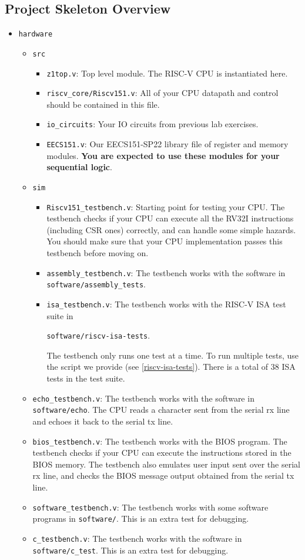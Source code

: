 \documentclass[11pt]{article}
\begin{document}
\subsection{Project Skeleton Overview}
\begin{itemize}
  \item \texttt{hardware}
    \begin{itemize}
      \item \texttt{src}
        \begin{itemize}
          \item \texttt{z1top.v}: Top level module. The RISC-V CPU is instantiated here.
          \item \texttt{riscv\_core/Riscv151.v}: All of your CPU datapath and control should be contained in this file.
          \item \texttt{io\_circuits}: Your IO circuits from previous lab exercises.
          \item \texttt{EECS151.v}: Our EECS151-SP22 library file of register and memory modules. \textbf{You are expected to use these modules for your sequential logic}.
        \end{itemize}
      \item \texttt{sim}
        \begin{itemize}
          \item \verb|Riscv151_testbench.v|: Starting point for testing your CPU. The testbench checks if your CPU can execute all the RV32I instructions (including CSR ones) correctly, and can handle some simple hazards. You should make sure that your CPU implementation passes this testbench before moving on.
          \item \verb|assembly_testbench.v|: The testbench works with the software in \texttt{software/assembly\_tests}.
          \item \verb|isa_testbench.v|: The testbench works with the RISC-V ISA test suite in

\texttt{software/riscv-isa-tests}.

The testbench only runs one test at a time. To run multiple tests, use the script we provide (see \ref{riscv-isa-tests}). There is a total of 38 ISA tests in the test suite.
        \end{itemize}
          \item \verb|echo_testbench.v|: The testbench works with the software in \texttt{software/echo}. The CPU reads a character sent from the serial rx line and echoes it back to the serial tx line.
          \item \verb|bios_testbench.v|: The testbench works with the BIOS program. The testbench checks if your CPU can execute the instructions stored in the BIOS memory. The testbench also emulates user input sent over the serial rx line, and checks the BIOS message output obtained from the serial tx line.
          \item \verb|software_testbench.v|: The testbench works with some software programs in \texttt{software/}. This is an extra test for debugging.
          \item \verb|c_testbench.v|: The testbench works with the software in \texttt{software/c\_test}. This is an extra test for debugging.


\end{itemize}
\end{itemize}
\end{document}
